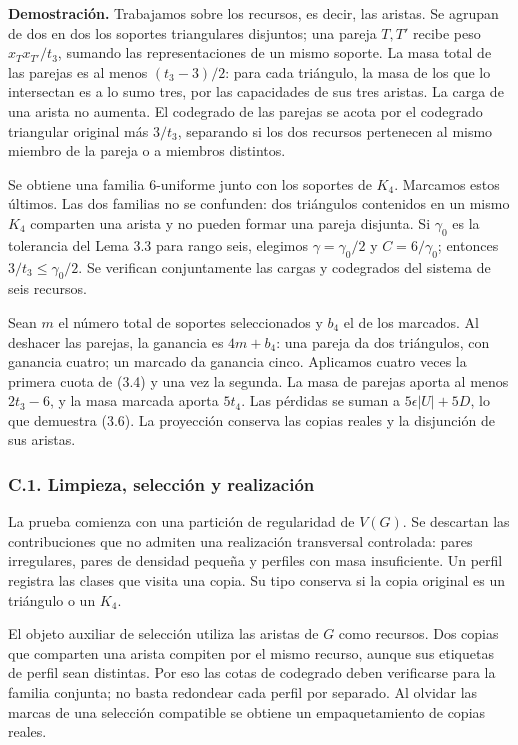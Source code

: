 \documentclass[spanish,11pt,a4paper]{article}
\begin{document}
\textbf{Demostración.} Trabajamos sobre los recursos, es decir, las aristas. Se agrupan de dos en dos los soportes triangulares disjuntos; una pareja \(T,T'\) recibe peso \(x_Tx_{T'}/t_3\), sumando las representaciones de un mismo soporte. La masa total de las parejas es al menos \((t_3-3)/2\): para cada triángulo, la masa de los que lo intersectan es a lo sumo tres, por las capacidades de sus tres aristas. La carga de una arista no aumenta. El codegrado de las parejas se acota por el codegrado triangular original más \(3/t_3\), separando si los dos recursos pertenecen al mismo miembro de la pareja o a miembros distintos.

Se obtiene una familia 6-uniforme junto con los soportes de \(K_4\). Marcamos estos últimos. Las dos familias no se confunden: dos triángulos contenidos en un mismo \(K_4\) comparten una arista y no pueden formar una pareja disjunta. Si \(\gamma_0\) es la tolerancia del Lema 3.3 para rango seis, elegimos \(\gamma=\gamma_0/2\) y \(C=6/\gamma_0\); entonces \(3/t_3\le\gamma_0/2\). Se verifican conjuntamente las cargas y codegrados del sistema de seis recursos.

Sean \(m\) el número total de soportes seleccionados y \(b_4\) el de los marcados. Al deshacer las parejas, la ganancia es \(4m+b_4\): una pareja da dos triángulos, con ganancia cuatro; un marcado da ganancia cinco. Aplicamos cuatro veces la primera cuota de (3.4) y una vez la segunda. La masa de parejas aporta al menos \(2t_3-6\), y la masa marcada aporta \(5t_4\). Las pérdidas se suman a \(5\epsilon|U|+5D\), lo que demuestra (3.6). La proyección conserva las copias reales y la disjunción de sus aristas.

\subsubsection{C.1. Limpieza, selección y realización}\label{c.1.-limpieza-seleccion-y-realizacion}

La prueba comienza con una partición de regularidad de \(V(G)\). Se descartan las contribuciones que no admiten una realización transversal controlada: pares irregulares, pares de densidad pequeña y perfiles con masa insuficiente. Un perfil registra las clases que visita una copia. Su tipo conserva si la copia original es un triángulo o un \(K_4\).

El objeto auxiliar de selección utiliza las aristas de \(G\) como recursos. Dos copias que comparten una arista compiten por el mismo recurso, aunque sus etiquetas de perfil sean distintas. Por eso las cotas de codegrado deben verificarse para la familia conjunta; no basta redondear cada perfil por separado. Al olvidar las marcas de una selección compatible se obtiene un empaquetamiento de copias reales.
\end{document}

